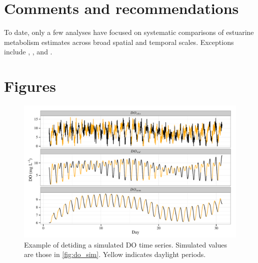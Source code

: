 \documentclass[letterpaper,12pt,oneside]{article}\usepackage[]{graphicx}\usepackage[]{color}
\makeatletter
\def\maxwidth{ %
  \ifdim\Gin@nat@width>\linewidth
    \linewidth
  \else
    \Gin@nat@width
  \fi
}
\newenvironment{knitrout}{}{} %
\makeatother
\begin{document}
\section{Comments and recommendations}

To date, only a few analyses have focused on systematic comparisons of estuarine metabolism estimates across broad spatial and temporal scales.  Exceptions include \citet{Caffrey03}, \citet{Caffrey04}, and \citet{Caffrey13}.

\begin{singlespace}


\end{singlespace}
\clearpage


\section{Figures}

\centering\vspace*{\fill}
\begin{knitrout}
\color{fgcolor}\begin{figure}[!ht]


{\centering \includegraphics[width=\maxwidth]{figure/do_dtd} 

}

\caption[Example of detiding a simulated \ac{DO} time series]{Example of detiding a simulated \ac{DO} time series.  Simulated values are those in \cref{fig:do_sim}.  Yellow indicates daylight periods.\label{fig:do_dtd}}
\end{figure}


\end{knitrout}
\vfill
\clearpage
\end{document}
